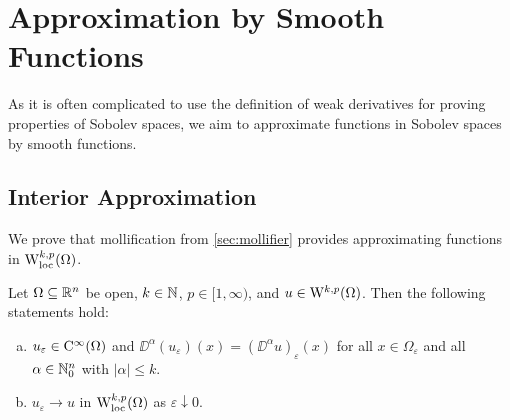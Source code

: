 \chapter{Approximation by Smooth Functions}

As it is often complicated to use the definition of weak derivatives for proving properties of Sobolev spaces, we aim to approximate functions in Sobolev spaces by smooth functions.

\section{Interior Approximation}

We prove that mollification from \ref{sec:mollifier} provides approximating functions in $\mathrm{W}_{\operatorname{loc}}^{k,p}(\Omega)$.

\begin{thm}\label{thm:interiorApproximation}
  Let $\Omega \subseteq \mathbb{R}^n$ be open, $k \in \mathbb{N}$, $p \in [1,\infty)$, and $u \in \mathrm{W}^{k,p}(\Omega)$.
    Then the following statements hold:
    \begin{enumerate}[a)]
      \item $u_\varepsilon \in \mathrm{C}^\infty(\Omega)$ and $\DD^\alpha(u_\varepsilon)(x) = (\DD^\alpha u)_\varepsilon(x)$ for all $ x \in \Omega_\varepsilon$ and all $\alpha \in \mathbb{N}_0^n$ with $|\alpha| \leq k$.
      \item $u_\varepsilon \to u$ in $\mathrm{W}_{\operatorname{loc}}^{k,p}(\Omega)$ as $\varepsilon \downarrow 0$.
    \end{enumerate}
\end{thm}

